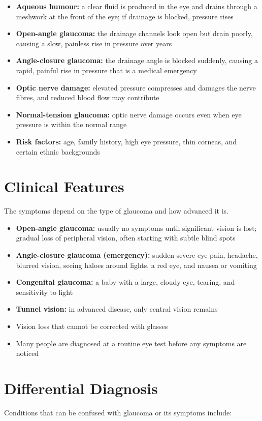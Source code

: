 \begin{itemize}
    \item \textbf{Aqueous humour:} a clear fluid is produced in the eye and drains through a meshwork at the front of the eye; if drainage is blocked, pressure rises
    \item \textbf{Open-angle glaucoma:} the drainage channels look open but drain poorly, causing a slow, painless rise in pressure over years
    \item \textbf{Angle-closure glaucoma:} the drainage angle is blocked suddenly, causing a rapid, painful rise in pressure that is a medical emergency
    \item \textbf{Optic nerve damage:} elevated pressure compresses and damages the nerve fibres, and reduced blood flow may contribute
    \item \textbf{Normal-tension glaucoma:} optic nerve damage occurs even when eye pressure is within the normal range
    \item \textbf{Risk factors:} age, family history, high eye pressure, thin corneas, and certain ethnic backgrounds
\end{itemize}

\section*{Clinical Features}
The symptoms depend on the type of glaucoma and how advanced it is.

\begin{itemize}
    \item \textbf{Open-angle glaucoma:} usually no symptoms until significant vision is lost; gradual loss of peripheral vision, often starting with subtle blind spots
    \item \textbf{Angle-closure glaucoma (emergency):} sudden severe eye pain, headache, blurred vision, seeing haloes around lights, a red eye, and nausea or vomiting
    \item \textbf{Congenital glaucoma:} a baby with a large, cloudy eye, tearing, and sensitivity to light
    \item \textbf{Tunnel vision:} in advanced disease, only central vision remains
    \item Vision loss that cannot be corrected with glasses
    \item Many people are diagnosed at a routine eye test before any symptoms are noticed
\end{itemize}

\section*{Differential Diagnosis}
Conditions that can be confused with glaucoma or its symptoms include:

